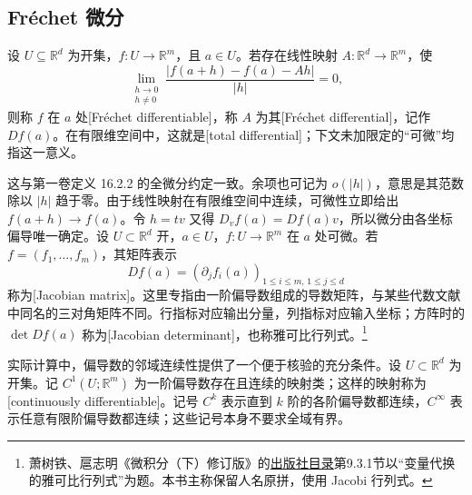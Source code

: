 \subsection{Fréchet 微分}
\label{b2:subsec:010102}

\begin{definition}\label{b2:def:01-frechet}
设 \(U\subseteq\mathbb R^d\) 为开集，\(f:U\rightarrow\mathbb R^m\)，且 \(a\in U\)。若存在线性映射 \(A:\mathbb R^d\rightarrow\mathbb R^m\)，使
\[
 \lim_{\substack{h\to0\\h\ne0}}
 \frac{\left|f(a+h)-f(a)-Ah\right|}{\lvert h\rvert}=0,
\]
则称 \(f\) 在 \(a\) 处[Fréchet differentiable]，称 \(A\) 为其[Fréchet differential]，记作 \(Df(a)\)。在有限维空间中，这就是[total differential]；下文未加限定的“可微”均指这一意义。
\end{definition}

这与第一卷定义 16.2.2 的全微分约定一致。余项也可记为 \(o(\lvert h\rvert)\)，意思是其范数除以 \(\lvert h\rvert\) 趋于零。由于线性映射在有限维空间中连续，可微性立即给出 \(f(a+h)\to f(a)\)。令 \(h=tv\) 又得 \(D_vf(a)=Df(a)v\)，所以微分由各坐标偏导唯一确定。设 \(U\subset\mathbb R^d\) 开，\(a\in U\)，\(f:U\to\mathbb R^m\) 在 \(a\) 处可微。若 \(f=(f_1,\ldots,f_m)\)，其矩阵表示
\[
 Df(a)=\left(\partial_jf_i(a)\right)_{1\leq i\leq m,\,1\leq j\leq d}
\]
称为[Jacobian matrix]。这里专指由一阶偏导数组成的导数矩阵，与某些代数文献中同名的三对角矩阵不同。行指标对应输出分量，列指标对应输入坐标；方阵时的 \(\det Df(a)\) 称为[Jacobian determinant]，也称雅可比行列式。\footnote{萧树铁、扈志明《微积分（下）修订版》的\href{https://www.tup.com.cn/booksCenter/book_02932206.html}{出版社目录}第9.3.1节以“变量代换的雅可比行列式”为题。本书主称保留人名原拼，使用 Jacobi 行列式。}

\ProseParagraphBreak

实际计算中，偏导数的邻域连续性提供了一个便于核验的充分条件。设 \(U\subset\mathbb R^d\) 为开集。记 \(C^1(U;\mathbb R^m)\) 为一阶偏导数存在且连续的映射类；这样的映射称为[continuously differentiable]。记号 \(C^k\) 表示直到 \(k\) 阶的各阶偏导数都连续，\(C^\infty\) 表示任意有限阶偏导数都连续；这些记号本身不要求全域有界。

